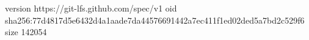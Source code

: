 version https://git-lfs.github.com/spec/v1
oid sha256:77d4817d5e6432d4a1aade7da44576691442a7ec411f1ed02ded5a7bd2c529f6
size 142054
